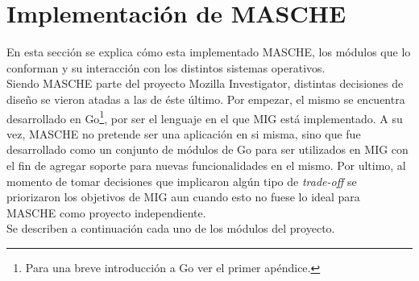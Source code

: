 \section{Implementación de MASCHE}

En esta sección se explica cómo esta implementado MASCHE, los módulos que lo
conforman y su interacción con los distintos sistemas operativos.\\

Siendo MASCHE parte del proyecto Mozilla Investigator, distintas decisiones de
diseño se vieron atadas a las de éste último. Por empezar, el mismo se
encuentra desarrollado en Go\footnote{Para una breve introducción a Go ver el
primer apéndice.}, por ser el lenguaje en el que MIG está implementado. A su
vez, MASCHE no pretende ser una aplicación en si misma, sino que fue
desarrollado como un conjunto de módulos de Go para ser utilizados en MIG con
el fin de agregar soporte para nuevas funcionalidades en el mismo. Por ultimo,
al momento de tomar decisiones que implicaron algún tipo de \textit{trade-off}
se priorizaron los objetivos de MIG aun cuando esto no fuese lo ideal para
MASCHE como proyecto independiente.\\

Se describen a continuación cada uno de los módulos del proyecto.\\
